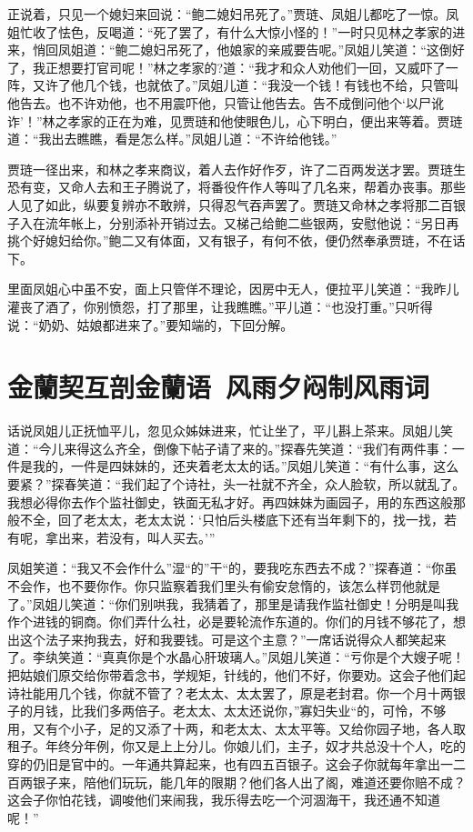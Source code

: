 \documentclass[12pt,oneside]{book}
\begin{document}
正说着，只见一个媳妇来回说：“鲍二媳妇吊死了。”贾琏、凤姐儿都吃了一惊。凤姐忙收了怯色，反喝道：“死了罢了，有什么大惊小怪的！”一时只见林之孝家的进来，悄回凤姐道：“鲍二媳妇吊死了，他娘家的亲戚要告呢。”凤姐儿笑道：“这倒好了，我正想要打官司呢！”林之孝家的?道：“我才和众人劝他们一回，又威吓了一阵，又许了他几个钱，也就依了。”凤姐儿道：“我没一个钱！有钱也不给，只管叫他告去。也不许劝他，也不用震吓他，只管让他告去。告不成倒问他个‘以尸讹诈’！”林之孝家的正在为难，见贾琏和他使眼色儿，心下明白，便出来等着。贾琏道：“我出去瞧瞧，看是怎么样。”凤姐儿道：“不许给他钱。”

贾琏一径出来，和林之孝来商议，着人去作好作歹，许了二百两发送才罢。贾琏生恐有变，又命人去和王子腾说了，将番役仵作人等叫了几名来，帮着办丧事。那些人见了如此，纵要复辨亦不敢辨，只得忍气吞声罢了。贾琏又命林之孝将那二百银子入在流年帐上，分别添补开销过去。又梯己给鲍二些银两，安慰他说：“另日再挑个好媳妇给你。”鲍二又有体面，又有银子，有何不依，便仍然奉承贾琏，不在话下。

里面凤姐心中虽不安，面上只管佯不理论，因房中无人，便拉平儿笑道：“我昨儿灌丧了酒了，你别愤怨，打了那里，让我瞧瞧。”平儿道：“也没打重。”只听得说：“奶奶、姑娘都进来了。”要知端的，下回分解。



 
\chapter{金蘭契互剖金蘭语~风雨夕闷制风雨词}
话说凤姐儿正抚恤平儿，忽见众姊妹进来，忙让坐了，平儿斟上茶来。凤姐儿笑道：“今儿来得这么齐全，倒像下帖子请了来的。”探春先笑道：“我们有两件事：一件是我的，一件是四妹妹的，还夹着老太太的话。”凤姐儿笑道：“有什么事，这么要紧？”探春笑道：“我们起了个诗社，头一社就不齐全，众人脸软，所以就乱了。我想必得你去作个监社御史，铁面无私才好。再四妹妹为画园子，用的东西这般那般不全，回了老太太，老太太说：‘只怕后头楼底下还有当年剩下的，找一找，若有呢，拿出来，若没有，叫人买去。’”

凤姐笑道：“我又不会作什么”湿“的”干“的，要我吃东西去不成？”探春道：“你虽不会作，也不要你作。你只监察着我们里头有偷安怠惰的，该怎么样罚他就是了。”凤姐儿笑道：“你们别哄我，我猜着了，那里是请我作监社御史！分明是叫我作个进钱的铜商。你们弄什么社，必是要轮流作东道的。你们的月钱不够花了，想出这个法子来拘我去，好和我要钱。可是这个主意？”一席话说得众人都笑起来了。李纨笑道：“真真你是个水晶心肝玻璃人。”凤姐儿笑道：“亏你是个大嫂子呢！把姑娘们原交给你带着念书，学规矩，针线的，他们不好，你要劝。这会子他们起诗社能用几个钱，你就不管了？老太太、太太罢了，原是老封君。你一个月十两银子的月钱，比我们多两倍子。老太太、太太还说你，”寡妇失业“的，可怜，不够用，又有个小子，足的又添了十两，和老太太、太太平等。又给你园子地，各人取租子。年终分年例，你又是上上分儿。你娘儿们，主子，奴才共总没十个人，吃的穿的仍旧是官中的。一年通共算起来，也有四五百银子。这会子你就每年拿出一二百两银子来，陪他们玩玩，能几年的限期？他们各人出了阁，难道还要你赔不成？这会子你怕花钱，调唆他们来闹我，我乐得去吃一个河涸海干，我还通不知道呢！”
\end{document}

